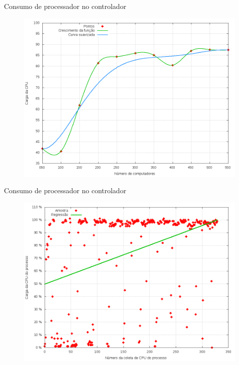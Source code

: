 \begin{frame}{Consumo de processador no controlador}

    \begin{figure}[!htb]
        \centering
        \includegraphics[scale=.35]{images/usr-cpu-growth}
    \end{figure}
\end{frame}


\begin{frame}{Consumo de processador no controlador}

    \begin{figure}[!htb]
        \centering
        \includegraphics[scale=.35]{images/scatter-usr-cpu}
    \end{figure}
\end{frame}



